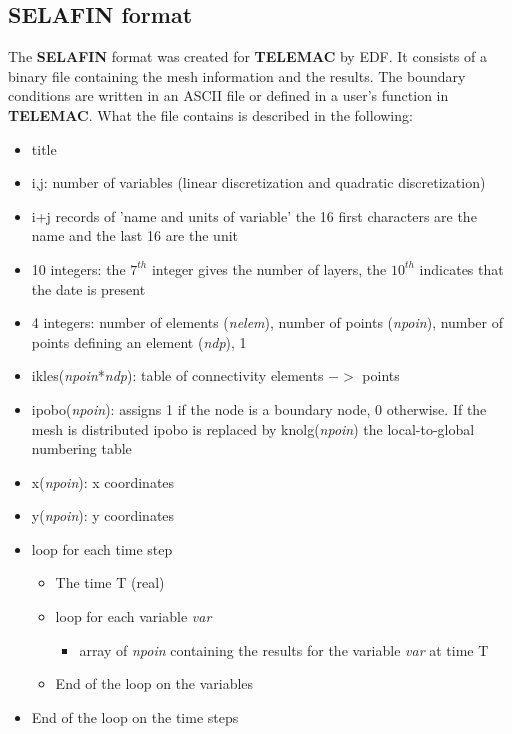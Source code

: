 \documentclass[a4paper,10pt]{article}
\newcommand{\tel}{\textbf{TELEMAC}\xspace}
\newcommand{\slf}{\textbf{SELAFIN}\xspace}
\begin{document}
\subsection{\slf format}

The \slf format was created for \tel by EDF. It consists of a binary file
containing the mesh information and the results.  The boundary conditions are
written in an ASCII file or defined in a user's function in \tel.  What the
file contains is described in the following:

\begin{itemize}
\setlength{\itemsep}{1pt}
\setlength{\parskip}{0pt}
\setlength{\parsep}{0pt}
\item title
\item i,j: number of variables (linear discretization and quadratic
discretization)
\item i+j records of 'name and units of variable' the 16 first characters are
the name and the last 16 are the unit
\item 10 integers: the $7^{th}$ integer gives the number of layers, the
$10^{th}$ indicates that the date is present
\item 4 integers: number of elements (\textit{nelem}), number of points
(\textit{npoin}), number of points defining an element (\textit{ndp}), 1
\item ikles(\textit{npoin}*\textit{ndp}): table of connectivity elements $->$
points
\item ipobo(\textit{npoin}): assigns 1 if the node is a boundary node, 0
otherwise.  If the mesh is distributed ipobo is replaced by
knolg(\textit{npoin}) the local-to-global numbering table
\item x(\textit{npoin}): x coordinates
\item y(\textit{npoin}): y coordinates
\item loop for each time step
\begin{itemize}
\setlength{\itemsep}{1pt}
\setlength{\parskip}{0pt}
\setlength{\parsep}{0pt}
\item The time T (real)
\item loop for each variable \textit{var}
\begin{itemize}
\setlength{\itemsep}{1pt}
\setlength{\parskip}{0pt}
\setlength{\parsep}{0pt}
\item array of \textit{npoin} containing the results for the variable
\textit{var} at time T
\end{itemize}
\item End of the loop on the variables
\end{itemize}
\item End of the loop on the time steps
\end{itemize}
\end{document}
